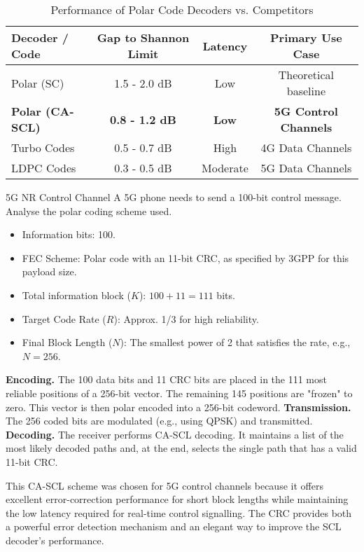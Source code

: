 \begin{table}[H]
    \centering
    \caption{Performance of Polar Code Decoders vs. Competitors}
    \label{tab:polar-performance}
    \begin{tabular}{@{}lccc@{}}
        \toprule
        \tableheaderfont Decoder / Code & \tableheaderfont Gap to Shannon Limit & \tableheaderfont Latency & \tableheaderfont Primary Use Case \\
        \midrule
        Polar (SC) & 1.5 - 2.0 dB & Low & Theoretical baseline \\
        \textbf{Polar (CA-SCL)} & \textbf{0.8 - 1.2 dB} & \textbf{Low} & \textbf{5G Control Channels} \\
        Turbo Codes & 0.5 - 0.7 dB & High & 4G Data Channels \\
        LDPC Codes & 0.3 - 0.5 dB & Moderate & 5G Data Channels \\
        \bottomrule
    \end{tabular}
\end{table}


\begin{workedexample}{5G NR Control Channel}
     A 5G phone needs to send a 100-bit control message. Analyse the polar coding scheme used.
    \begin{itemize}
        \item Information bits: 100.
        \item FEC Scheme: Polar code with an 11-bit CRC, as specified by 3GPP for this payload size.
        \item Total information block ($K$): $100 + 11 = 111$ bits.
        \item Target Code Rate ($R$): Approx. 1/3 for high reliability.
        \item Final Block Length ($N$): The smallest power of 2 that satisfies the rate, e.g., $N=256$.
    \end{itemize}
    \begin{derivationsteps}
        \step \textbf{Encoding.} The 100 data bits and 11 CRC bits are placed in the 111 most reliable positions of a 256-bit vector. The remaining 145 positions are "frozen" to zero. This vector is then polar encoded into a 256-bit codeword.
        \step \textbf{Transmission.} The 256 coded bits are modulated (e.g., using QPSK) and transmitted.
        \step \textbf{Decoding.} The receiver performs CA-SCL decoding. It maintains a list of the most likely decoded paths and, at the end, selects the single path that has a valid 11-bit CRC.
    \end{derivationsteps}
     This CA-SCL scheme was chosen for 5G control channels because it offers excellent error-correction performance for short block lengths while maintaining the low latency required for real-time control signalling. The CRC provides both a powerful error detection mechanism and an elegant way to improve the SCL decoder's performance.
\end{workedexample}


